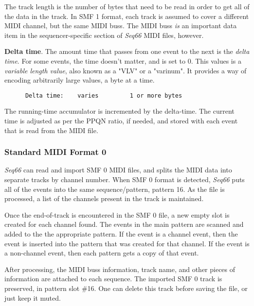    The track length is the number of bytes that need to be read in order to get
   all of the data in the track.
   In SMF 1 format, each track is assumed to cover a different MIDI channel,
   but the same MIDI buss.
   The MIDI buss \textsl{is} an important data item in the sequencer-specific
   section of \textsl{Seq66} MIDI files, however.

   \textbf{Delta time}.
   The amount time that passes from one event to the next is the
   \textsl{delta time}.
   For some events, the time doesn't matter, and is set to 0.
   This values is a
   \textsl{variable length value}, also known as a "VLV" or a "varinum".   It
   provides a way of encoding arbitrarily large values, a byte at a time.

   \begin{verbatim}
      Delta time:    varies         1 or more bytes
   \end{verbatim}

   The running-time accumulator is incremented by the delta-time.
   The current time is adjusted as per the PPQN ratio, if needed, and stored with
   each event that is read from the MIDI file.

\subsubsection{Standard MIDI Format 0}
\label{subsubsec:midi_format_smf_0_import}

   \textsl{Seq66} can read and import SMF 0 MIDI files, and splits
   the MIDI data into separate tracks by channel number.
   When SMF 0 format is detected, \textsl{Seq66} puts all of
   the events into the same sequence/pattern, pattern 16.
   As the file is processed, a list of the channels present in the
   track is maintained.

   Once the end-of-track is encountered in the SMF 0 file, a new empty
   slot is created for each channel found.
   The events in the main pattern are scanned and added to the
   the appropriate pattern.  If the event is a channel event,
   then the event is inserted into the pattern that was created for that
   channel.  If the event is a non-channel event, then each pattern gets a
   copy of that event.

   After processing, the MIDI buss information, track name, and other pieces of
   information are attached to each sequence.
   The imported SMF 0 track is preserved, in pattern slot \#16.
   One can delete this track before saving the file, or just keep it muted.

